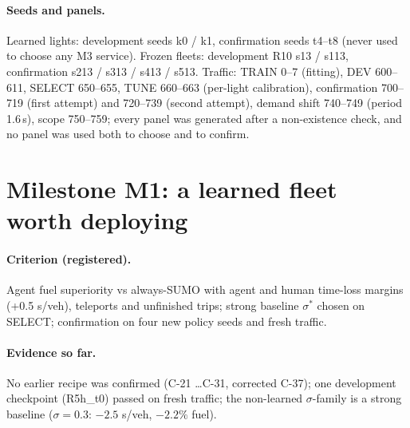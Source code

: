 \documentclass[11pt]{article}
\begin{document}
\paragraph{Seeds and panels.} Learned lights: development seeds k0 / k1, confirmation seeds t4--t8 (never used to choose any M3 service).
Frozen fleets: development R10 s13 / s113, confirmation s213 / s313 / s413 / s513. Traffic: TRAIN 0--7 (fitting), DEV 600--611, SELECT
650--655, TUNE 660--663 (per-light calibration), confirmation 700--719 (first attempt) and 720--739 (second attempt), demand shift
740--749 (period 1.6\,s), scope 750--759; every panel was generated after a non-existence check, and no panel was used both to choose
and to confirm.

\section{Milestone M1: a learned fleet worth deploying}
\paragraph{Criterion (registered).} Agent fuel superiority vs always-SUMO with agent and human time-loss margins (+0.5 s/veh),
teleports and unfinished trips; strong baseline $\sigma^*$ chosen on SELECT; confirmation on four new policy seeds and fresh traffic.
\paragraph{Evidence so far.} No earlier recipe was confirmed (C-21 \dots C-31, corrected C-37); one development checkpoint (R5h\_t0)
passed on fresh traffic; the non-learned $\sigma$-family is a strong baseline ($\sigma=0.3$: $-2.5$ s/veh, $-2.2\%$ fuel).
\end{document}
